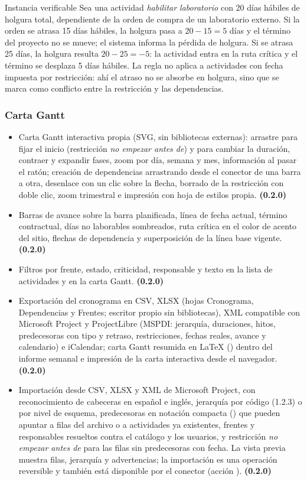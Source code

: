 \documentclass[11pt,a4paper]{article}
\begin{document}
\begin{cajaacento}{Instancia verificable}
Sea una actividad \emph{habilitar laboratorio} con 20 días hábiles de holgura total, dependiente de la orden de compra de un laboratorio externo. Si la orden se atrasa 15 días hábiles, la holgura pasa a $20-15=5$ días y el término del proyecto no se mueve; el sistema informa la pérdida de holgura. Si se atrasa 25 días, la holgura resulta $20-25=-5$: la actividad entra en la ruta crítica y el término se desplaza 5 días hábiles. La regla no aplica a actividades con fecha impuesta por restricción: ahí el atraso no se absorbe en holgura, sino que se marca como conflicto entre la restricción y las dependencias.
\end{cajaacento}

\subsubsection{Carta Gantt}
\begin{itemize}
\item Carta Gantt interactiva propia (SVG, sin bibliotecas externas): arrastre para fijar el inicio (restricción \emph{no empezar antes de}) y para cambiar la duración, contraer y expandir fases, zoom por día, semana y mes, información al pasar el ratón; creación de dependencias arrastrando desde el conector de una barra a otra, desenlace con un clic sobre la flecha, borrado de la restricción con doble clic, zoom trimestral e impresión con hoja de estilos propia. \textbf{(0.2.0)}
\item Barras de avance sobre la barra planificada, línea de fecha actual, término contractual, días no laborables sombreados, ruta crítica en el color de acento del sitio, flechas de dependencia y superposición de la línea base vigente. \textbf{(0.2.0)}
\item Filtros por frente, estado, criticidad, responsable y texto en la lista de actividades y en la carta Gantt. \textbf{(0.2.0)}
\item Exportación del cronograma en CSV, XLSX (hojas Cronograma, Dependencias y Frentes; escritor propio sin bibliotecas), XML compatible con Microsoft Project y ProjectLibre (MSPDI: jerarquía, duraciones, hitos, predecesoras con tipo y retraso, restricciones, fechas reales, avance y calendario) e iCalendar; carta Gantt resumida en LaTeX () dentro del informe semanal e impresión de la carta interactiva desde el navegador. \textbf{(0.2.0)}
\item Importación desde CSV, XLSX y XML de Microsoft Project, con reconocimiento de cabeceras en español e inglés, jerarquía por código (1.2.3) o por nivel de esquema, predecesoras en notación compacta () que pueden apuntar a filas del archivo o a actividades ya existentes, frentes y responsables resueltos contra el catálogo y los usuarios, y restricción \emph{no empezar antes de} para las filas sin predecesoras con fecha. La vista previa muestra filas, jerarquía y advertencias; la importación es una operación reversible y también está disponible por el conector (acción ). \textbf{(0.2.0)}
\end{itemize}
\end{document}
